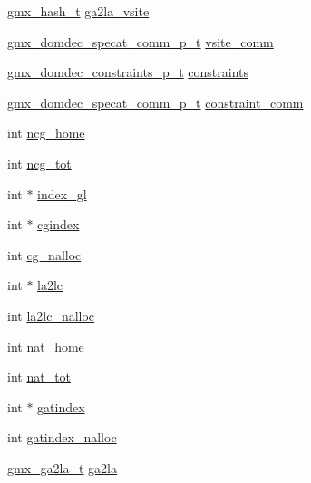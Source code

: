 \begin{DoxyCompactItemize}
\item 
\hyperlink{include_2types_2commrec_8h_a560df2747fed5736f0666039be2e9e49}{gmx\-\_\-hash\-\_\-t} \hyperlink{structgmx__domdec__t_ab7bd9eb962c86bd16145bf9175c81382}{ga2la\-\_\-vsite}
\item 
\hyperlink{include_2types_2commrec_8h_a919e64466aca8ba325da709fdba9c941}{gmx\-\_\-domdec\-\_\-specat\-\_\-comm\-\_\-p\-\_\-t} \hyperlink{structgmx__domdec__t_af7034751c9790e81184338ea0fedf2eb}{vsite\-\_\-comm}
\item 
\hyperlink{include_2types_2commrec_8h_a85781ada1472c942765c52a7ddb4bb07}{gmx\-\_\-domdec\-\_\-constraints\-\_\-p\-\_\-t} \hyperlink{structgmx__domdec__t_aa387f381347e655afeb20487675ccd98}{constraints}
\item 
\hyperlink{include_2types_2commrec_8h_a919e64466aca8ba325da709fdba9c941}{gmx\-\_\-domdec\-\_\-specat\-\_\-comm\-\_\-p\-\_\-t} \hyperlink{structgmx__domdec__t_ab17b8c66243be893fdf2757b64d29eb4}{constraint\-\_\-comm}
\item 
int \hyperlink{structgmx__domdec__t_a300d45929c8cadbde7f173835cd911ad}{ncg\-\_\-home}
\item 
int \hyperlink{structgmx__domdec__t_aeba3b8dc6d8a667c49910a190e5b9097}{ncg\-\_\-tot}
\item 
int $\ast$ \hyperlink{structgmx__domdec__t_a76f8dd85003bb2e153a48d54238e3131}{index\-\_\-gl}
\item 
int $\ast$ \hyperlink{structgmx__domdec__t_ac652de7b7e3747015dec3c8be497aed4}{cgindex}
\item 
int \hyperlink{structgmx__domdec__t_aed640418b53083305a9326e3632adf0e}{cg\-\_\-nalloc}
\item 
int $\ast$ \hyperlink{structgmx__domdec__t_a4b9828fe277d611b50e2a40a8fc0c863}{la2lc}
\item 
int \hyperlink{structgmx__domdec__t_a53f727bd6184f3b75e91855f6f33caba}{la2lc\-\_\-nalloc}
\item 
int \hyperlink{structgmx__domdec__t_a0e744041723f7d6556e31bf7a433ba4b}{nat\-\_\-home}
\item 
int \hyperlink{structgmx__domdec__t_ad2178eb00707ab664d08e9cd6cccce5d}{nat\-\_\-tot}
\item 
int $\ast$ \hyperlink{structgmx__domdec__t_aa0b2d75e7ac6a61ef4cbb93806e14e7e}{gatindex}
\item 
int \hyperlink{structgmx__domdec__t_a1771634257c1712d2ef0cf5460fe3abd}{gatindex\-\_\-nalloc}
\item 
\hyperlink{include_2types_2commrec_8h_afc231fdc02683c223ce94b6dee2a0e46}{gmx\-\_\-ga2la\-\_\-t} \hyperlink{structgmx__domdec__t_a1b0e960706db3ded7b4db8c865d5a3f8}{ga2la}

\end{DoxyCompactItemize}
